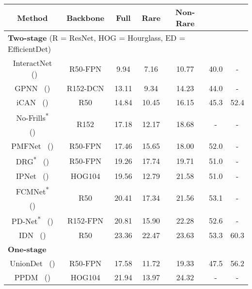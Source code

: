 \documentclass[letterpaper]{article} \usepackage{aaai22}  \usepackage{times}  \usepackage{helvet}  \usepackage{courier}  \usepackage[hyphens]{url}  \usepackage{graphicx} \urlstyle{rm} \def\UrlFont{\rm}  \usepackage{natbib}  \usepackage{caption} \DeclareCaptionStyle{ruled}{labelfont=normalfont,labelsep=colon,strut=off} \frenchspacing  \setlength{\pdfpagewidth}{8.5in}  \setlength{\pdfpageheight}{11in}  \usepackage{algorithm}
\begin{document}
\begin{table}[t]
  \scriptsize
  \setlength{\tabcolsep}{1pt}
  \centering
    \begin{tabular}{ccccc|cc}
    \Xhline{1.0pt}
    \textbf{Method} & \textbf{Backbone} & \textbf{Full} & \textbf{Rare} & {\tiny \textbf{Non-Rare}} & {\tiny } & {\tiny } \\
    \hline
    \hline
    \multicolumn{5}{l}{\textbf{Two-stage} \quad (R = ResNet, HOG = Hourglass, ED = EfficientDet)} \\
    \hline
    InteractNet \ (\citeauthor{kaiming18DetectHOI}) & R50-FPN & 9.94  & 7.16  & 10.77 & 40.0 & - \\
    GPNN \ (\citeauthor{Qi2018GPNN}) & R152-DCN & 13.11  & 9.34  & 14.23 & 44.0 & - \\
    iCAN \ (\citeauthor{gao2018ican}) & R50 & 14.84  & 10.45  & 16.15 & 45.3 & 52.4 \\
No-Frills\textsuperscript{*} & \multirow{2}[2]{*}{R152} & \multirow{2}[2]{*}{17.18} & \multirow{2}[2]{*}{12.17} & \multirow{2}[2]{*}{18.68} & \multirow{2}[2]{*}{-} & \multirow{2}[2]{*}{-} \\
    {\tiny (\citeauthor{gupta2019nofrills})}  &       &       &       &       &       &  \\
    PMFNet \ (\citeauthor{wan2019PMFNet}) & R50-FPN & 17.46  & 15.65  & 18.00 & 52.0 & - \\
    DRG\textsuperscript{*} \ (\citeauthor{gao2020DRG})  & R50-FPN & 19.26  & 17.74  & 19.71 & 51.0 & - \\
    IPNet \ (\citeauthor{wang2020IPNet}) & HOG104 & 19.56  & 12.79  & 21.58 & 51.0 & - \\
FCMNet\textsuperscript{*} & \multirow{2}[2]{*}{R50} & \multirow{2}[2]{*}{20.41} & \multirow{2}[2]{*}{17.34} & \multirow{2}[2]{*}{21.56} & \multirow{2}[2]{*}{53.1} & \multirow{2}[2]{*}{-} \\
    {\tiny (\citeauthor{gupta2019nofrills})}  &       &       &       &       &       &  \\
PD-Net\textsuperscript{*} \ (\citeauthor{zhong2020polysemy})  & R152-FPN & 20.81  & 15.90  & 22.28 & 52.6 & - \\
    IDN \ (\citeauthor{li2020hoianalysis})  & R50 & 23.36  & 22.47  & 23.63 & 53.3 & 60.3 \\
\hline
    \multicolumn{5}{l}{\textbf{One-stage}} \\
    \hline
    UnionDet \ (\citeauthor{kim2020uniondet}) & R50-FPN & 17.58  & 11.72  & 19.33 & 47.5 & 56.2  \\
    PPDM \ (\citeauthor{liao2020ppdm}) & HOG104 & 21.94  & 13.97  & 24.32 & - & - \\

\end{tabular}
\end{table}
\end{document}
